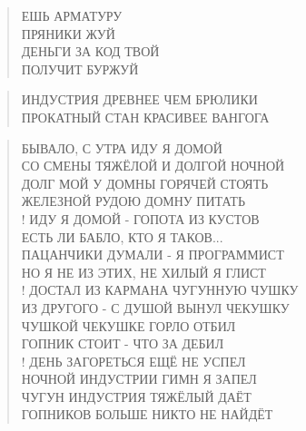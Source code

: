 \poemtitle{***}
\begin{verse}
ЕШЬ АРМАТУРУ\\
ПРЯНИКИ ЖУЙ\\
ДЕНЬГИ ЗА КОД ТВОЙ\\
ПОЛУЧИТ БУРЖУЙ
\end{verse}

\poemtitle{***}
\begin{verse}
ИНДУСТРИЯ ДРЕВНЕЕ ЧЕМ БРЮЛИКИ\\
ПРОКАТНЫЙ СТАН КРАСИВЕЕ ВАНГОГА
\end{verse}

\poemtitle{***}
\begin{verse}
БЫВАЛО, С УТРА ИДУ Я ДОМОЙ\\
СО СМЕНЫ ТЯЖЁЛОЙ И ДОЛГОЙ НОЧНОЙ\\
ДОЛГ МОЙ У ДОМНЫ ГОРЯЧЕЙ СТОЯТЬ\\
ЖЕЛЕЗНОЙ РУДОЮ ДОМНУ ПИТАТЬ\\!
ИДУ Я ДОМОЙ - ГОПОТА ИЗ КУСТОВ\\
ЕСТЬ ЛИ БАБЛО, КТО Я ТАКОВ...\\
ПАЦАНЧИКИ ДУМАЛИ - Я ПРОГРАММИСТ\\
НО Я НЕ ИЗ ЭТИХ, НЕ ХИЛЫЙ Я ГЛИСТ\\!
ДОСТАЛ ИЗ КАРМАНА ЧУГУННУЮ ЧУШКУ\\
ИЗ ДРУГОГО - С ДУШОЙ ВЫНУЛ ЧЕКУШКУ\\
ЧУШКОЙ ЧЕКУШКЕ ГОРЛО ОТБИЛ\\
ГОПНИК СТОИТ - ЧТО ЗА ДЕБИЛ\\!
ДЕНЬ ЗАГОРЕТЬСЯ ЕЩЁ НЕ УСПЕЛ\\
НОЧНОЙ ИНДУСТРИИ ГИМН Я ЗАПЕЛ\\
ЧУГУН ИНДУСТРИЯ ТЯЖЁЛЫЙ ДАЁТ\\
ГОПНИКОВ БОЛЬШЕ НИКТО НЕ НАЙДЁТ
\end{verse}

